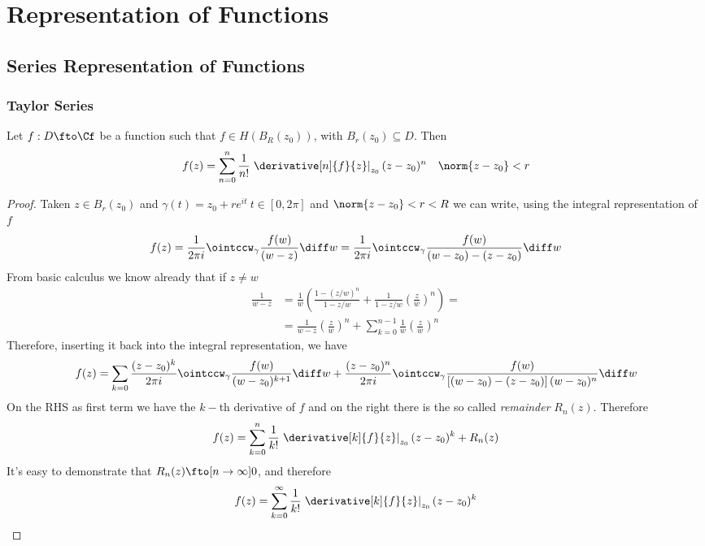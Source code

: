 \documentclass[../mmf.tex]{subfiles}
\begin{document}
\chapter{Representation of Functions}
\section{Series Representation of Functions}
\subsection{Taylor Series}
\begin{thm}
	Let $f:D\fto\Cf$ be a function such that $f\in H(B_R(z_0))$, with $B_r(z_0)\subseteq D$. Then
	\begin{equation}
		f(z)=\sum_{n=0}^n\frac{1}{n!}\left.\derivative[n]{f}{z}\right|_{z_0}(z-z_0)^n\quad\norm{z-z_0}<r
		\label{eq:taylor}
	\end{equation}
\end{thm}
\begin{proof}
	Taken $z\in B_r(z_0)$ and $\gamma(t)=z_0+re^{it}\ t\in[0,2\pi]$ and $\norm{z-z_0}<r<R$ we can write, using the integral representation of $f$
	\begin{equation*}
		f(z)=\frac{1}{2\pi i}\ointccw_{\gamma}\frac{f(w)}{(w-z)}\diff w=\frac{1}{2\pi i}\ointccw_{\gamma}\frac{f(w)}{(w-z_0)-(z-z_0)}\diff w
	\end{equation*}
	From basic calculus we know already that if $z\ne w$
	\begin{equation*}
		\begin{aligned}
			\frac{1}{w-z}&=\frac{1}{w}\left( \frac{1-(z/w)^n}{1-z/w}+\frac{1}{1-z/w}\left( \frac{z}{w} \right)^n \right)=\\
			&=\frac{1}{w-z}\left( \frac{z}{w} \right)^n+\sum_{k=0}^{n-1}\frac{1}{w}\left( \frac{z}{w} \right)^n
		\end{aligned}
	\end{equation*}
	Therefore, inserting it back into the integral representation, we have
	\begin{equation*}
		f(z)=\sum_{k=0}\frac{(z-z_0)^k}{2\pi i}\ointccw_{\gamma}\frac{f(w)}{(w-z_0)^{k+1}}\diff w+\frac{(z-z_0)^n}{2\pi i}\ointccw_\gamma\frac{f(w)}{\left[ (w-z_0)-(z-z_0) \right](w-z_0)^n}\diff w
	\end{equation*}
	On the RHS as first term we have the $k-$th derivative of $f$ and on the right there is the so called \textit{remainder} $R_n(z)$. Therefore
	\begin{equation*}
		f(z)=\sum_{k=0}^{n}\frac{1}{k!}\left.\derivative[k]{f}{z}\right|_{z_0}(z-z_0)^k+R_n(z)
	\end{equation*}
	It's easy to demonstrate that $R_n(z)\fto[n\to\infty]0$, and therefore
	\begin{equation*}
		f(z)=\sum_{k=0}^\infty\frac{1}{k!}\left.\derivative[k]{f}{z}\right|_{z_0}(z-z_0)^k
	\end{equation*}
\end{proof}
\end{document}
